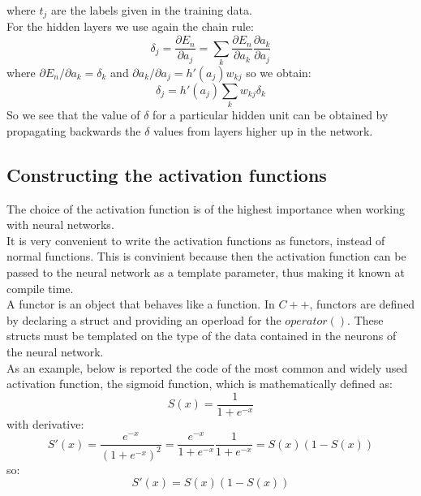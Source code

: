 \documentclass[12pt]{article}
\begin{document}
where $t_j$ are the labels given in the training data. \\
For the hidden layers we use again the chain rule:
\begin{equation}
  \delta_j = \frac{\partial E_n}{\partial a_j}
  = \sum_k \frac{\partial E_n}{\partial a_k}\frac{\partial a_k}{\partial a_j}
  \label{hidden_layers_delta}
\end{equation}
where $\partial E_n / \partial a_k = \delta_k$ and $\partial a_k / \partial a_j = h'(a_j)w_{kj}$
so we obtain:
\begin{equation}
  \delta_j = h'(a_j)\sum_k w_{kj}\delta_k
  \label{simplified_hidden_layer_delta}
\end{equation}
So we see that the value of $\delta$ for a particular hidden unit can be obtained by propagating backwards the $\delta$ values from layers higher up in the network.

\subsection{Constructing the activation functions}
The choice of the activation function is of the highest importance when working with neural networks. \\
It is very convenient to write the activation functions as functors, instead of normal functions. This is
convinient because then the activation function can be passed to the neural network as a template parameter,
thus making it known at compile time. \\
A functor is an object that behaves like a function. In $C++$, functors are defined by declaring a struct 
and providing an operload for the $operator()$. These structs must be templated on the type of the data
contained in the neurons of the neural network. \\
As an example, below is reported the code of the most common and widely used activation function, the sigmoid
function, which is mathematically defined as:
\begin{equation}
  S(x) = \frac{1}{1 + e^{-x}}
\end{equation}
with derivative:
$$
  S'(x) = \frac{e^{-x}}{(1 + e^{-x})^2} = \frac{e^{-x}}{1 + e^{-x}}\frac{1}{1 + e^{-x}} 
  = S(x)\left(1 - S(x)\right)
$$
so:
\begin{equation}
  S'(x) = S(x)\left(1 - S(x)\right)
\end{equation}
\end{document}

